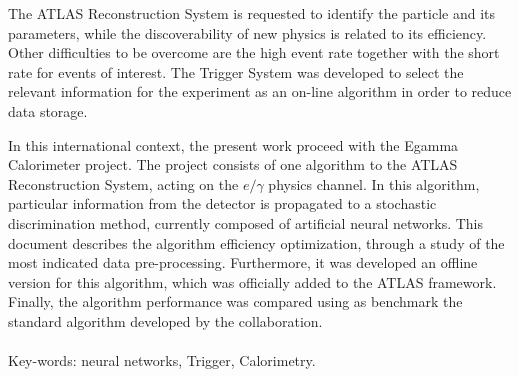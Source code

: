 The ATLAS Reconstruction System is requested to identify the particle and its
parameters, while the discoverability of new physics is related to its
efficiency. Other difficulties to be overcome are the high event rate together
with the short rate for events of interest. The Trigger System was developed to
select the relevant information for the experiment as an on-line algorithm in
order to reduce data storage.

In this international context, the present work proceed with the Egamma
Calorimeter project. The project consists of one algorithm to the 
ATLAS Reconstruction System, 
acting on the $e/\gamma$ physics channel. In this algorithm,
particular information from the detector is propagated to a stochastic
discrimination method, currently composed of artificial neural networks.
This document describes the algorithm efficiency optimization, through a study
of the most indicated data pre-processing. Furthermore, it was developed an
offline version for this algorithm, which was officially added to the ATLAS framework. 
Finally, the algorithm performance was compared using as benchmark the
standard algorithm developed by the collaboration.

\paragraph*{}

\noindent Key-words: neural networks, Trigger, Calorimetry.


\vfill
